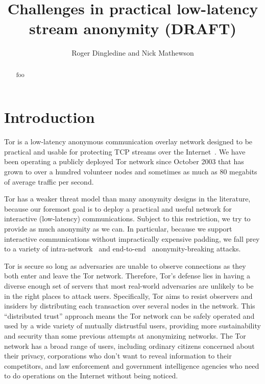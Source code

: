 \documentclass{llncs}
\begin{document}
\title{Challenges in practical low-latency stream anonymity (DRAFT)}

\author{Roger Dingledine and Nick Mathewson}

\maketitle
\pagestyle{empty}

\begin{abstract}
foo
\end{abstract}

\section{Introduction}

Tor is a low-latency anonymous communication overlay network designed
to be practical and usable for protecting TCP streams over the
Internet~\cite{tor-design}. We have been operating a publicly deployed
Tor network since October 2003 that has grown to over a hundred volunteer
nodes and sometimes as much as 80 megabits of average traffic per second.

Tor has a weaker threat model than many anonymity designs in the
literature, because our foremost goal is to deploy a
practical and useful network for interactive (low-latency) communications.
Subject to this restriction, we try to
provide as much anonymity as we can. In particular, because we
support interactive communications without impractically expensive padding,
we fall prey to a variety
of intra-network~\cite{attack-tor-oak05,flow-correlation04,bar} and
end-to-end~\cite{danezis-pet2004,SS03} anonymity-breaking attacks.

Tor is secure so long as adversaries are unable to
observe connections as they both enter and leave the Tor network.
Therefore, Tor's defense lies in having a diverse enough set of servers
that most real-world
adversaries are unlikely to be in the right places to attack users.
Specifically,
Tor aims to resist observers and insiders by distributing each transaction
over several nodes in the network.  This ``distributed trust'' approach
means the Tor network can be safely operated and used by a wide variety
of mutually distrustful users, providing more sustainability and security
than some previous attempts at anonymizing networks.
The Tor network has a broad range of users, including ordinary citizens
concerned about their privacy, corporations
who don't want to reveal information to their competitors, and law
enforcement and government intelligence agencies who need
to do operations on the Internet without being noticed.
\end{document}
